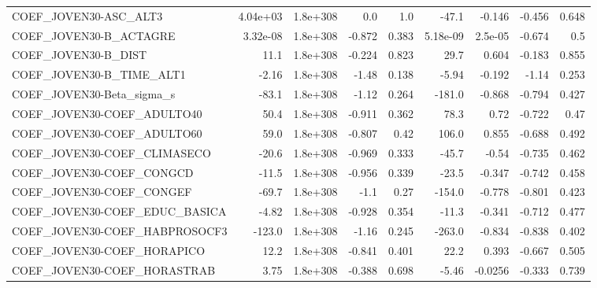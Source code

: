 \begin{tabular}{lrrrrrrrr}
COEF\_JOVEN30-ASC\_ALT3             &    4.04e+03 &     1.8e+308 &     0.0 &      1.0 &      -47.1 &      -0.146 &       -0.456 &         0.648 \\
COEF\_JOVEN30-B\_ACTAGRE            &    3.32e-08 &     1.8e+308 &  -0.872 &    0.383 &   5.18e-09 &     2.5e-05 &       -0.674 &           0.5 \\
COEF\_JOVEN30-B\_DIST               &        11.1 &     1.8e+308 &  -0.224 &    0.823 &       29.7 &       0.604 &       -0.183 &         0.855 \\
COEF\_JOVEN30-B\_TIME\_ALT1          &       -2.16 &     1.8e+308 &   -1.48 &    0.138 &      -5.94 &      -0.192 &        -1.14 &         0.253 \\
COEF\_JOVEN30-Beta\_sigma\_s         &       -83.1 &     1.8e+308 &   -1.12 &    0.264 &     -181.0 &      -0.868 &       -0.794 &         0.427 \\
COEF\_JOVEN30-COEF\_ADULTO40        &        50.4 &     1.8e+308 &  -0.911 &    0.362 &       78.3 &        0.72 &       -0.722 &          0.47 \\
COEF\_JOVEN30-COEF\_ADULTO60        &        59.0 &     1.8e+308 &  -0.807 &     0.42 &      106.0 &       0.855 &       -0.688 &         0.492 \\
COEF\_JOVEN30-COEF\_CLIMASECO       &       -20.6 &     1.8e+308 &  -0.969 &    0.333 &      -45.7 &       -0.54 &       -0.735 &         0.462 \\
COEF\_JOVEN30-COEF\_CONGCD          &       -11.5 &     1.8e+308 &  -0.956 &    0.339 &      -23.5 &      -0.347 &       -0.742 &         0.458 \\
COEF\_JOVEN30-COEF\_CONGEF          &       -69.7 &     1.8e+308 &    -1.1 &     0.27 &     -154.0 &      -0.778 &       -0.801 &         0.423 \\
COEF\_JOVEN30-COEF\_EDUC\_BASICA     &       -4.82 &     1.8e+308 &  -0.928 &    0.354 &      -11.3 &      -0.341 &       -0.712 &         0.477 \\
COEF\_JOVEN30-COEF\_HABPROSOCF3     &      -123.0 &     1.8e+308 &   -1.16 &    0.245 &     -263.0 &      -0.834 &       -0.838 &         0.402 \\
COEF\_JOVEN30-COEF\_HORAPICO        &        12.2 &     1.8e+308 &  -0.841 &    0.401 &       22.2 &       0.393 &       -0.667 &         0.505 \\
COEF\_JOVEN30-COEF\_HORASTRAB       &        3.75 &     1.8e+308 &  -0.388 &    0.698 &      -5.46 &     -0.0256 &       -0.333 &         0.739 \\

\end{tabular}
